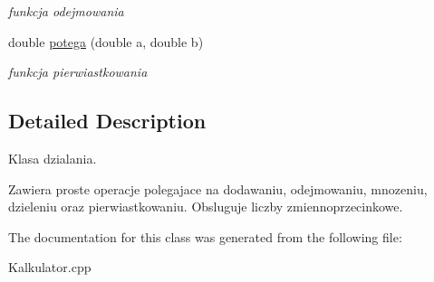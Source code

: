 \begin{DoxyCompactItemize}
\begin{DoxyCompactList}\small\item\em funkcja odejmowania \end{DoxyCompactList}\item 
\hypertarget{classdzialania_af0053414eb5e56844ef90512ff48d0ac}{double \hyperlink{classdzialania_af0053414eb5e56844ef90512ff48d0ac}{potega} (double a, double b)}\label{classdzialania_af0053414eb5e56844ef90512ff48d0ac}

\begin{DoxyCompactList}\small\item\em funkcja pierwiastkowania \end{DoxyCompactList}\end{DoxyCompactItemize}


\subsection{Detailed Description}
Klasa dzialania. 

Zawiera proste operacje polegajace na dodawaniu, odejmowaniu, mnozeniu, dzieleniu oraz pierwiastkowaniu. Obsluguje liczby zmiennoprzecinkowe. 

The documentation for this class was generated from the following file\+:\begin{DoxyCompactItemize}
\item 
Kalkulator.\+cpp\end{DoxyCompactItemize}
